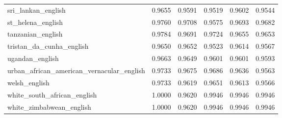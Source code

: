 \begin{longtable}{lccccc}
sri\_lankan\_english & 0.9655 & 0.9591 & 0.9519 & 0.9602 & 0.9544 \\
st\_helena\_english & 0.9760 & 0.9708 & 0.9575 & 0.9693 & 0.9682 \\
tanzanian\_english & 0.9784 & 0.9691 & 0.9724 & 0.9655 & 0.9653 \\
tristan\_da\_cunha\_english & 0.9650 & 0.9652 & 0.9523 & 0.9614 & 0.9567 \\
ugandan\_english & 0.9663 & 0.9649 & 0.9601 & 0.9601 & 0.9593 \\
urban\_african\_american\_vernacular\_english & 0.9733 & 0.9675 & 0.9686 & 0.9636 & 0.9563 \\
welsh\_english & 0.9733 & 0.9619 & 0.9651 & 0.9613 & 0.9566 \\
white\_south\_african\_english & 1.0000 & 0.9620 & 0.9946 & 0.9946 & 0.9946 \\
white\_zimbabwean\_english & 1.0000 & 0.9620 & 0.9946 & 0.9946 & 0.9946 \\
\bottomrule
\end{longtable}